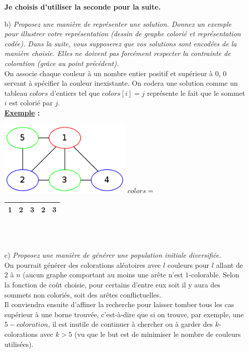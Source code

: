 \documentclass{article}
\newcommand{\term}[1]{\textit{\textcolor{maintitle}{#1}}}
\begin{document}
\begin{sffamily}
\begin{enumerate}
\textbf{Je choisis d'utiliser la seconde pour la suite.}

\item[b)] \term{Proposez une manière de représenter une solution. Donnez un exemple pour illustrer votre représentation (dessin 
de graphe colorié et représentation codée). Dans la suite, vous supposerez que vos solutions sont encodées de la manière choisie. 
Elles ne doivent pas forcément respecter la contrainte de coloration (grâce au point précédent).}\\

On associe chaque couleur à un nombre entier positif et supérieur à 0, 0 servant à spécifier la couleur inexistante. On codera 
une solution comme un tableau $colors$ d'entiers tel que $colors[i]=j$ représente le fait que le sommet $i$ est colorié par $j$.
\\

\textbf{\underline{Exemple} :} 

\begin{center}
    \includegraphics[width=240px]{ex1.png}
    $colors = $
	\begin{tabular}{|c|c|c|c|c|}
	\hline
	1 & 2 & 3 & 2 & 3\\
	\hline
	\end{tabular} \\$ $\\
\end{center}	

\item[c)] \term{Proposez une manière de générer une population initiale diversifiée.} \\

On pourrait générer des colorations aléatoires avec $l$ couleurs pour $l$ allant de $2$ à $n$ (aucun graphe comportant au moins 
une arête n'est $1$-colorable. Selon la fonction de coût choisie, pour certains d'entre eux soit il y aura des sommets non 
coloriés, soit des arêtes conflictuelles. \\

Il conviendra ensuite d'affiner la recherche pour laisser tomber tous les cas supérieur à une borne trouvée, c'est-à-dire que si 
on trouve, par exemple, une $5-coloration$, il est inutile de continuer à chercher ou à garder des $k$-colorations avec $k>5$ (vu 
que le but est de minimiser le nombre de couleurs utilisées).


\end{enumerate}
\end{sffamily}
\end{document}
